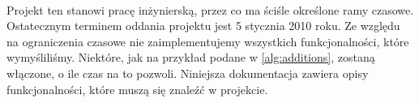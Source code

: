 \paragraph{}

Projekt ten stanowi pracę inżynierską, przez co ma ściśle określone ramy czasowe. Ostatecznym terminem oddania projektu jest 5 stycznia 2010 roku. Ze względu na ograniczenia czasowe nie zaimplementujemy wszystkich funkcjonalności, które wymyśliliśmy. Niektóre, jak na przykład podane w \ref{alg:additions}, zostaną włączone, o ile czas na to pozwoli. Niniejsza dokumentacja zawiera opisy funkcjonalności, które muszą się znaleźć w projekcie.

